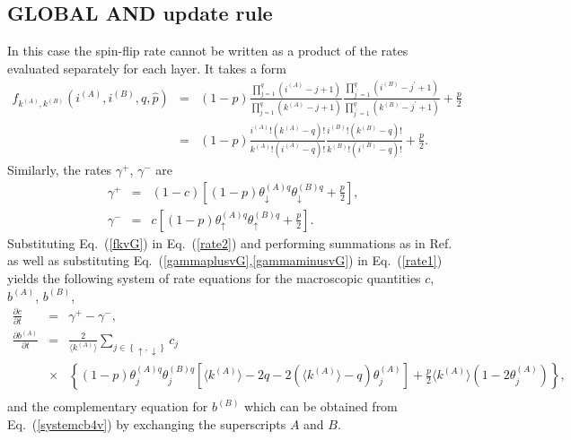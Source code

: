\documentclass[11pt]{article}
\begin{document}
\subsection{GLOBAL AND update rule}

In this case the spin-flip rate cannot be written as a product of the rates evaluated separately for each layer. It takes a form
\begin{eqnarray}
f_{k^{(A)},k^{(B)}}\left( i^{(A)},i^{(B)},q,\hat{p}\right) &=&
(1-p) \frac{\prod_{j=1}^{q}\left( i^{(A)}-j+1\right)}{\prod_{j=1}^{q}\left( k^{(A)}-j+1\right)} 
\frac{\prod_{j^{\prime}=1}^{q}\left( i^{(B)}-j^{\prime}+1\right)}{\prod_{j^{\prime}=1}^{q}\left( k^{(B)}-j^{\prime}+1\right)} 
+\frac{p}{2}
\nonumber\\
&=&
(1-p)\frac{i^{(A)}!\left( k^{(A)} -q\right)!}{k^{(A)}!\left(i^{(A)}-q\right)!} 
\frac{i^{(B)}!\left( k^{(B)} -q\right)!}{k^{(B)}!\left(i^{(B)}-q\right)!}
+\frac{p}{2}.
\label{fkvG}
\end{eqnarray}
Similarly, the rates
$\gamma^{+}$, $\gamma^{-}$ are
\begin{eqnarray}
\gamma^{+}&=& (1-c) \left[ (1-p)\theta_{\downarrow}^{(A)q}\theta_{\downarrow}^{(B)q} +\frac{p}{2}\right], 
\label{gammaplusvG}
\\
\gamma^{-}&=& c \left[ (1-p)\theta_{\uparrow}^{(A)q} \theta_{\uparrow}^{(B)q}+\frac{p}{2}\right].
\label{gammaminusvG}
\end{eqnarray}
Substituting Eq.\ (\ref{fkvG}) in Eq.\ (\ref{rate2}) and performing summations as in Ref.\ \cite{Jedrzejewski17} as well as
substituting Eq.\ (\ref{gammaplusvG},\ref{gammaminusvG}) in Eq.\ (\ref{rate1}) yields the following system of rate
equations for the macroscopic quantities $c$, $b^{(A)}$, $b^{(B)}$,
\begin{eqnarray}
\frac{\partial c}{\partial t} &=&\gamma^{+}-\gamma^{-}, 
\label{systemcb3vG}\\
\frac{\partial b^{(A)}}{\partial t} &=& \frac{2}{\langle k^{(A)}\rangle} \sum_{j\in \left\{ \uparrow,\downarrow\right\}} c_{j} \nonumber\\
& \times&  \left\{ (1-p) \theta_{j}^{(A)q} \theta_{j}^{(B)q}
\left[  \langle k^{(A)}\rangle-2q -2 \left( \langle k^{(A)}\rangle -q\right) \theta_{j}^{(A)} \right]
+\frac{p}{2}\langle k^{(A)}\rangle \left(1-2 \theta_{j}^{(A)}\right) \right\}, \nonumber\\
&&
\label{systemcb4vG}
\end{eqnarray}
and the complementary equation for $b^{(B)}$ which can be obtained from Eq.\ (\ref{systemcb4v}) by exchanging the 
superscripts $A$ and $B$.
\end{document}
